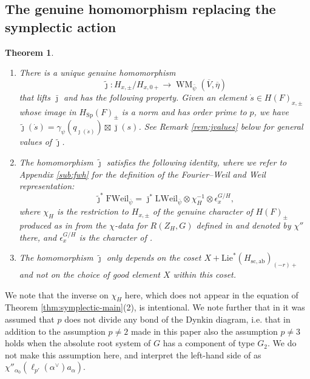 \documentclass{article}
\def\ol#1{\overline{#1}}
\DeclareMathOperator{\Sp}{Sp}
\newtheorem{thm}{Theorem}[subsection]
\theoremstyle{definition}
\numberwithin{equation}{subsection}
\renewcommand{\-}{\hyp{}}
\DeclareMathOperator{\WM}{WM}
\newcommand{\oV}{\ol{V}}
\begin{document}
\subsection{The genuine homomorphism replacing the symplectic action}

\begin{thm}
	\label{thm:main1}
	 \leavevmode
	\begin{enumerate}
		\item \label{item:thm:main1} There is a unique genuine homomorphism 
		\[ \tilde \jmath : H_{x,\pm}/H_{x,0+} \to \WM_{\bar\psi}(\oV,\ol{\eta}) \]
		that lifts $\bar\jmath$ and has the following property. Given an element $\dot s \in H(F)_{x,\pm}$ whose image in $H_{\Sp}(F)_\pm$ is a norm and has order prime to $p$, we have $\tilde\jmath(\dot s) = \gamma_\psi(q_{\jmath(\dot s)}) \boxtimes \bar\jmath(s)$. See Remark \ref{rem:jvalues} below for general values of $\tilde\jmath$.
		
		\item \label{item:FWeilvsLWeil} The homomorphism $\tilde \jmath$ satisfies the following identity, where we refer to Appendix \ref{sub:fwh} for the definition of the Fourier--Weil and Weil representation:
\[ \tilde\jmath^*\mathrm{FWeil}_{\bar\psi} = \bar\jmath^*\mathrm{LWeil}_{\bar\psi} \otimes \chi_H^{-1} \otimes \epsilon_x^{G/H},\] 
		where $\chi_H$ is the restriction to $H_{x,\pm}$ of the genuine character of $H(F)_\pm$ produced  as in \cite[\S3.2]{KalDC} from the $\chi$-data for $R(Z_H,G)$ 
defined in \cite[\S4.2]{FKS23} and denoted by $\chi''$ there, and $\epsilon_x^{G/H}$ is the character of \cite[Lemma~4.1.2]{FKS23}. 

		\item \label{item:independenceofX} The homomorphism $\tilde \jmath$ only depends on the coset $X + \mathrm{Lie}^*(H_\mathrm{sc,ab})_{(-r)+}$ and not on the choice of good element $X$ within this coset.
	\end{enumerate}
\end{thm}

We note that the inverse on $\chi_H$ here, which does not appear in the equation of Theorem \ref{thm:symplectic-main}(2), is intentional. We note further that in \cite[\S4.2]{FKS23} it was assumed that $p$ does not divide any bond of the Dynkin diagram, i.e. that in addition to the assumption $p \neq 2$ made in this paper also the assumption $p \neq 3$ holds when the absolute root system of $G$ has a component of type $G_2$. We do not make this assumption here, and interpret the left-hand side of \cite[(4.2.5)]{FKS23} as $\chi''_{\alpha_0}(\ell_{p'}(\alpha^\vee)a_\alpha)$.
\end{document}
